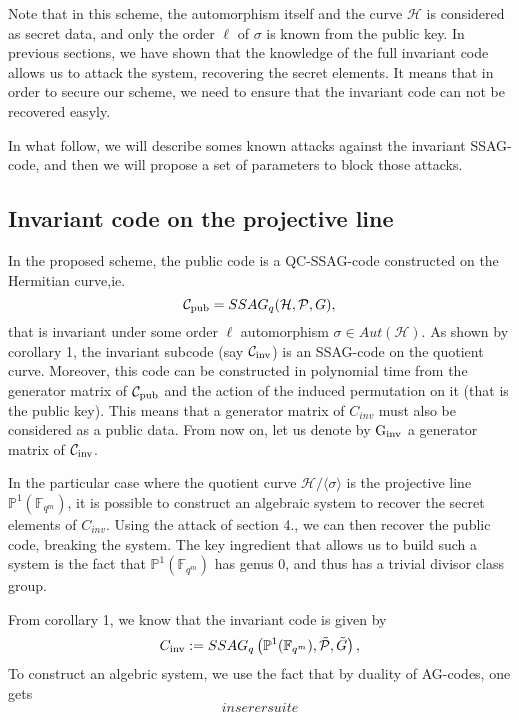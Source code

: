 \documentclass[10pt]{article}
\newcommand{\s}{\vspace{0.3cm}}
\newcommand{\fqm}{\mathbb{F}_{q^m}}
\newcommand{\PR}{\mathcal{P}}
\begin{document}
Note that in this scheme, the automorphism itself and the curve $\mathcal{H}$ is considered as secret data, and only the order $\ell$ of $\sigma$ is known from the public key. In previous sections, we have shown that the knowledge of the full invariant code allows us to attack the system, recovering the secret elements. It means that in order to secure our scheme, we need to ensure that the invariant code can not be recovered easyly. 

\s

In what follow, we will describe somes known attacks against the invariant SSAG-code, and then we will propose a set of parameters to block those attacks.

\s

\subsection{Invariant code on the projective line}

\s

In the proposed scheme, the public code is a QC-SSAG-code constructed on the Hermitian curve,ie. 
\[\mathcal{C}_{\rm pub} = SSAG_q(\mathcal{H},\PR,G),\]
that is invariant under some order $\ell$ automorphism $\sigma \in Aut(\mathcal{H})$. As shown by corollary 1, the invariant subcode (say $\mathcal{C}_{\rm inv}$) is an SSAG-code on the quotient curve. Moreover, this code can be constructed in polynomial time from the generator matrix of $\mathcal{C}_{\rm pub}$ and the action of the induced permutation on it (that is the public key). This means that a generator matrix of $C_{inv}$ must also be considered as a public data. From now on, let us denote by $\rm G_{inv}$ a generator matrix of $\mathcal{C}_{\rm inv}$.  

\s

In the particular case where the quotient curve $\mathcal{H}/\langle\sigma\rangle$ is the projective line $\mathbb{P}^1(\fqm)$, it is possible to construct an algebraic system to recover the secret elements of $C_{inv}$. Using the attack of section 4., we can then recover the public code, breaking the system. The key ingredient that allows us to build such a system is the fact that $\mathbb{P}^1(\fqm)$ has genus $0$, and thus has a trivial divisor class group. 

\s

From corollary 1, we know that the invariant code is given by 
\[C_{\rm{inv}} := SSAG_q\left(\mathbb{P}^1(\fqm),\tilde{\PR},\tilde{G}\right),\]
To construct an algebric system, we use the fact that by duality of AG-codes, one gets 
\[ inserer suite\]
\end{document}
